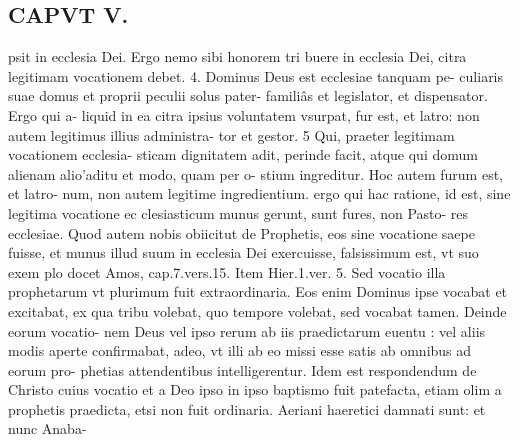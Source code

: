 \documentclass{article}
\begin{document}
\begin{pages}
\section*{CAPVT V. }
\marginpar{[ p.343 ]}\pstart psit in ecclesia Dei. Ergo nemo sibi honorem tri buere in ecclesia Dei, citra legitimam vocationem debet. 4. Dominus Deus est ecclesiae tanquam pe- culiaris suae domus et proprii peculii solus pater- familiâs et legislator, et dispensator. Ergo qui a- liquid in ea citra ipsius voluntatem vsurpat, fur est, et latro: non autem legitimus illius administra- tor et gestor. 5 Qui, praeter legitimam vocationem ecclesia- sticam dignitatem adit, perinde facit, atque qui domum alienam alio’aditu et modo, quam per o- stium ingreditur. Hoc autem furum est, et latro- num, non autem legitime ingredientium. ergo qui hac ratione, id est, sine legitima vocatione ec clesiasticum munus gerunt, sunt fures, non Pasto- res ecclesiae. Quod autem nobis obiicitut de Prophetis, eos sine vocatione saepe fuisse, et munus illud suum in ecclesia Dei exercuisse, falsissimum est, vt suo exem plo docet Amos, cap.7.vers.15. Item Hier.1.ver. 5. Sed vocatio illa prophetarum vt plurimum fuit extraordinaria. Eos enim Dominus ipse vocabat et excitabat, ex qua tribu volebat, quo tempore volebat, sed vocabat tamen. Deinde eorum vocatio- nem Deus vel ipso rerum ab iis praedictarum euentu : vel aliis modis aperte confirmabat, adeo, vt illi ab eo missi esse satis ab omnibus ad eorum pro- phetias attendentibus intelligerentur. Idem est respondendum de Christo cuius vocatio et a Deo ipso in ipso baptismo fuit patefacta, etiam olim a prophetis praedicta, etsi non fuit ordinaria. Aeriani haeretici damnati sunt: et nunc Anaba-  \pend

\end{pages}
\end{document}
